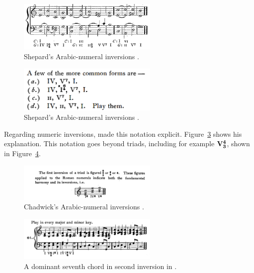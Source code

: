\begin{figure}[h!]
    \centering
    \includegraphics[width=0.6\textwidth]{figures/chapter/2/primary_sources/shepard1896harmony184.png}
    \caption{Shepard's Arabic-numeral inversions \textcite{shepard1896harmony}.}
    \label{fig:shepard1896harmony184}
\end{figure}

\begin{figure}[h!]
    \centering
    \includegraphics[width=0.6\textwidth]{figures/chapter/2/primary_sources/shepard1896harmony117.png}
    \caption{Shepard's Arabic-numeral inversions \textcite{shepard1896harmony}.}
    \label{fig:shepard1896harmony117}
\end{figure}

Regarding numeric inversions, \textcite{chadwick1897harmony} made this notation explicit.
Figure~\ref{fig:chadwick1897harmony012} shows his explanation.
This notation goes beyond triads, including for example
$\textbf{V}\relax\relax{\footnotesize {}^\textbf{4}\relax_\textbf{3}\relax\relax}$, shown in Figure~\ref{fig:chadwick1897harmony028}.

\begin{figure}[h!]
    \centering
    \includegraphics[width=0.6\textwidth]{figures/chapter/2/primary_sources/chadwick1897harmony012.png}
    \caption{Chadwick's Arabic-numeral inversions \textcite{chadwick1897harmony}.}
    \label{fig:chadwick1897harmony012}
\end{figure}

\begin{figure}[h!]
    \centering
    \includegraphics[width=0.6\textwidth]{figures/chapter/2/primary_sources/chadwick1897harmony028.png}
    \caption{A dominant seventh chord in second inversion in \textcite{chadwick1897harmony}.}
    \label{fig:chadwick1897harmony028}
\end{figure}

